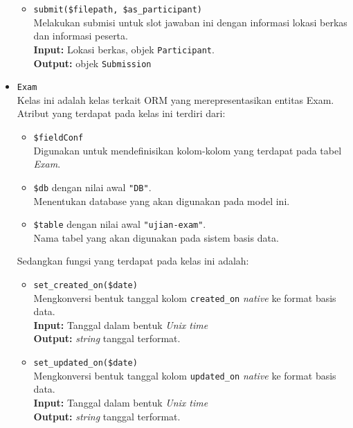 \begin{itemize}
\begin{itemize}
                \item \texttt{submit(\$filepath, \$as\_participant)} \\
                    Melakukan submisi untuk slot jawaban ini dengan informasi lokasi berkas
                    dan informasi peserta. \\
                    \textbf{Input:} Lokasi berkas, objek \texttt{Participant}.\\
                    \textbf{Output:} objek \texttt{Submission}
                    
            \end{itemize}
            
        \item \texttt{Exam} \\
            Kelas ini adalah kelas terkait ORM yang merepresentasikan entitas Exam. Atribut yang 
            terdapat pada kelas ini terdiri dari:
            \begin{itemize}
                \item \texttt{\$fieldConf} \\
                    Digunakan untuk mendefinisikan kolom-kolom yang terdapat pada tabel \textit{Exam}.
                \item \texttt{\$db} dengan nilai awal \texttt{"DB"}. \\
                    Menentukan database yang akan digunakan pada model ini.
                \item \texttt{\$table} dengan nilai awal \texttt{"ujian-exam"}. \\
                    Nama tabel yang akan digunakan pada sistem basis data. 
            \end{itemize}
            Sedangkan fungsi yang terdapat pada kelas ini adalah:
            \begin{itemize}
                \item \texttt{set\_created\_on(\$date)} \\
                    Mengkonversi bentuk tanggal kolom \texttt{created\_on} \textit{native} ke 
                    format basis data. \\
                    \textbf{Input:} Tanggal dalam bentuk \textit{Unix time}\\
                    \textbf{Output:} \textit{string} tanggal terformat.
                
                \item \texttt{set\_updated\_on(\$date)} \\
                    Mengkonversi bentuk tanggal kolom \texttt{updated\_on} \textit{native} ke 
                    format basis data. \\
                    \textbf{Input:} Tanggal dalam bentuk \textit{Unix time}\\
                    \textbf{Output:} \textit{string} tanggal terformat.
                    

\end{itemize}
\end{itemize}

